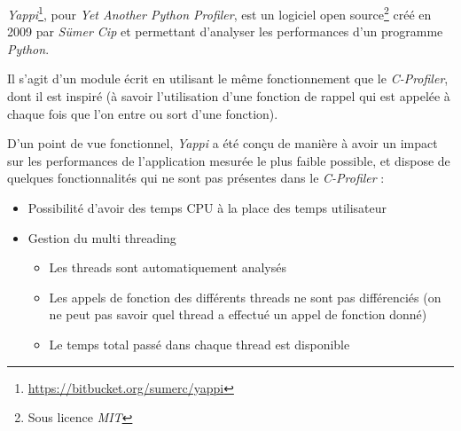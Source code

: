 \emph{Yappi}\footnote{\url{https://bitbucket.org/sumerc/yappi}}, pour \emph{Yet Another Python Profiler}, est un logiciel open source\footnote{Sous licence \emph{MIT}} créé en 2009 par \emph{Sümer Cip} et permettant d'analyser les performances d'un programme \emph{Python}.

Il s'agit d'un module écrit en \C utilisant le même fonctionnement que le \emph{C-Profiler}, dont il est inspiré (à savoir l'utilisation d'une fonction de rappel qui est appelée à chaque fois que l'on entre ou sort d'une fonction).

D'un point de vue fonctionnel, \emph{Yappi} a été conçu de manière à avoir un impact sur les performances de l'application mesurée le plus faible possible, et dispose de quelques fonctionnalités qui ne sont pas présentes dans le \emph{C-Profiler} :
\begin{itemize}
\item Possibilité d'avoir des temps CPU à la place des temps utilisateur
\item Gestion du multi threading
\begin{itemize}
\item Les threads sont automatiquement analysés
\item Les appels de fonction des différents threads ne sont pas différenciés (on ne peut pas savoir quel thread a effectué un appel de fonction donné) 
\item Le temps total passé dans chaque thread est disponible
\end{itemize}
\end{itemize}
